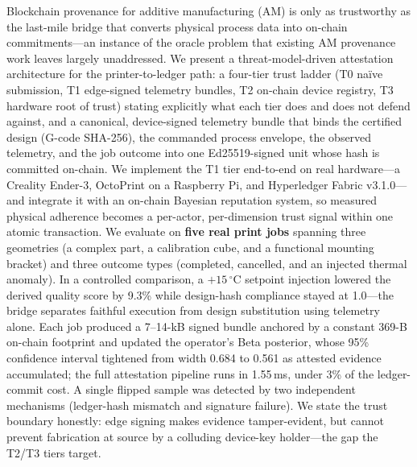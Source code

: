 Blockchain provenance for additive manufacturing (AM) is only as
trustworthy as the last-mile bridge that converts physical process data
into on-chain commitments---an instance of the oracle problem that
existing AM provenance work leaves largely unaddressed.  We present a
threat-model-driven attestation architecture for the printer-to-ledger
path: a four-tier trust ladder (T0 na\"ive submission, T1 edge-signed
telemetry bundles, T2 on-chain device registry, T3 hardware root of
trust) stating explicitly what each tier does and does not defend
against, and a canonical, device-signed telemetry bundle that binds the
certified design (G-code SHA-256), the commanded process envelope, the
observed telemetry, and the job outcome into one Ed25519-signed unit
whose hash is committed on-chain.  We implement the T1 tier end-to-end on
real hardware---a Creality Ender-3, OctoPrint on a Raspberry Pi, and
Hyperledger Fabric v3.1.0---and integrate it with an on-chain Bayesian
reputation system, so measured physical adherence becomes a per-actor,
per-dimension trust signal within one atomic transaction.  We evaluate on
\textbf{five real print jobs} spanning three geometries (a complex part, a
calibration cube, and a functional mounting bracket) and three outcome
types (completed, cancelled, and an injected thermal anomaly).  In a
controlled comparison, a $+15\,^{\circ}$C setpoint injection lowered the
derived quality score by 9.3\% while design-hash compliance stayed at
1.0---the bridge separates faithful execution from design substitution
using telemetry alone.  Each job produced a 7--14-kB signed bundle anchored
by a constant 369-B on-chain footprint and updated the operator's Beta
posterior, whose 95\% confidence interval tightened from width 0.684 to
0.561 as attested evidence accumulated; the full attestation pipeline runs
in 1.55\,ms, under 3\% of the ledger-commit cost.  A single flipped sample
was detected by two independent mechanisms (ledger-hash mismatch and
signature failure).  We state the trust boundary honestly: edge signing
makes evidence tamper-evident, but cannot prevent fabrication at source by
a colluding device-key holder---the gap the T2/T3 tiers target.
